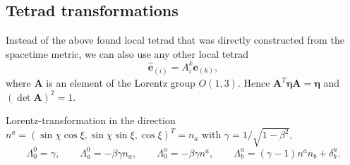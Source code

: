 \documentclass[10pt,twoside,notitlepage,a4paper,fleqn,openbib]{report}
\begin{document}
\subsection{Tetrad transformations}
Instead of the above found local tetrad that was directly constructed from the spacetime metric, we can also use any other local tetrad
\begin{equation}
  \mathbf{\hat{e}}_{(i)} = A_i^k\mathbf{e}_{(k)},
\end{equation}
where $\mathbf{A}$ is an element of the Lorentz group $O(1,3)$. Hence $\mathbf{A}^T\boldsymbol{\eta}\mathbf{A}=\boldsymbol{\eta}$ and $(\det{\mathbf{A}})^2=1$.

Lorentz-transformation in the direction $n^a=(\sin\chi\cos\xi,\sin\chi\sin\xi,\cos\xi)^T=n_a$ with $\gamma=1/\sqrt{1-\beta^2}$,
\begin{equation}
 \Lambda_0^0 = \gamma,\qquad \Lambda_a^0 = -\beta\gamma n_a,\qquad \Lambda_0^a = -\beta\gamma n^a,\qquad \Lambda_b^a = (\gamma-1)n^an_b+\delta^a_b.
\end{equation}


\end{document}
